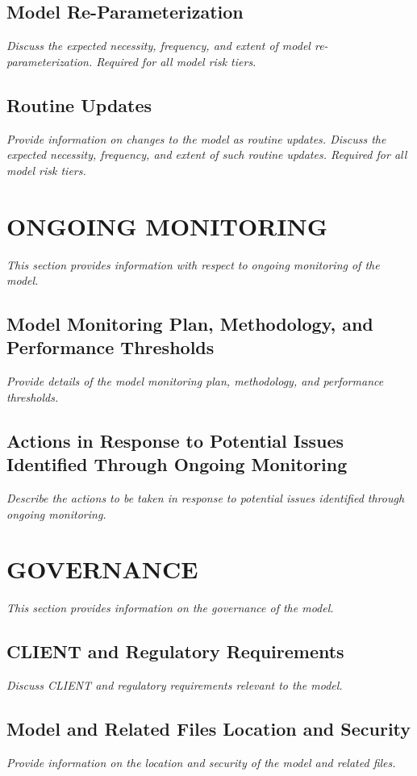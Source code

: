 \documentclass[12pt,letterpaper]{article}
\begin{document}
\subsection{Model Re-Parameterization}
\textit{Discuss the expected necessity, frequency, and extent of model re-parameterization. Required for all model risk tiers.}

\subsection{Routine Updates}
\textit{Provide information on changes to the model as routine updates. Discuss the expected necessity, frequency, and extent of such routine updates. Required for all model risk tiers.}

\section{ONGOING MONITORING}
\textit{This section provides information with respect to ongoing monitoring of the model.}

\subsection{Model Monitoring Plan, Methodology, and Performance Thresholds}
\textit{Provide details of the model monitoring plan, methodology, and performance thresholds.}

\subsection{Actions in Response to Potential Issues Identified Through Ongoing Monitoring}
\textit{Describe the actions to be taken in response to potential issues identified through ongoing monitoring.}

\section{GOVERNANCE}
\textit{This section provides information on the governance of the model.}

\subsection{CLIENT and Regulatory Requirements}
\textit{Discuss CLIENT and regulatory requirements relevant to the model.}

\subsection{Model and Related Files Location and Security}
\textit{Provide information on the location and security of the model and related files.}
\end{document}
